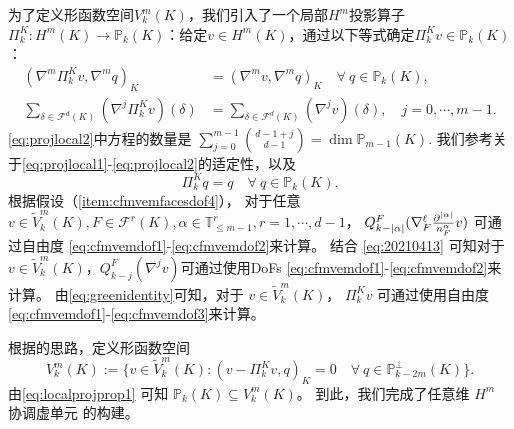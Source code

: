 为了定义形函数空间$V_k^m(K)$，我们引入了一个局部$H^m$投影算子$\Pi_k^K: H^m(K)\to\mathbb P_k(K)$：给定$v\in H^m(K)$，通过以下等式确定$\Pi_k^Kv\in\mathbb P_k(K)$：
\begin{align}
(\nabla^m\Pi_k^Kv, \nabla^mq)_K&=(\nabla^mv, \nabla^mq)_K\quad  \forall~q\in \mathbb P_k(K),\label{eq:projlocal1}\\
\sum_{\delta\in\mathcal F^{d}(K)}(\nabla^{j}\Pi_k^Kv)(\delta)&=\sum_{\delta\in\mathcal F^{d}(K)}(\nabla^{j}v)(\delta), \quad j=0,\cdots, m-1.\label{eq:projlocal2}
\end{align}
\eqref{eq:projlocal2}中方程的数量是
$
\sum\limits_{j=0}^{m-1}{d-1+j\choose d-1}=\dim\mathbb P_{m-1}(K).
$
我们参考\cite[3.3节引理~3.5]{ChenHuang2020}关于\eqref{eq:projlocal1}-\eqref{eq:projlocal2}的适定性，以及
\begin{equation}\label{eq:localprojprop1}
\Pi_k^Kq=q \quad\forall~q\in\mathbb P_k(K).
\end{equation}
根据假设（\ref{item:cfmvemfacesdof4}），
对于任意 $v\in \tilde{V}_{k}^m(K), F\in\mathcal F^r(K), \alpha\in \mathbb{T}^r_{\leq
m-1}, r=1,\cdots,
d-1$，
$Q_{k-|\alpha|}^F(\nabla_F^{\ell}\frac{\partial^{|\alpha|}}{n_F^{\alpha}}v)$
可通过自由度
\eqref{eq:cfmvemdof1}-\eqref{eq:cfmvemdof2}来计算。
结合 \eqref{eq:20210413} 可知对于 $v \in \tilde{V}_k^m(K)$，$Q_{k-j}^F(\nabla^jv)$可通过使用DoFs
\eqref{eq:cfmvemdof1}-\eqref{eq:cfmvemdof2}来计算。
由\eqref{eq:greenidentity}可知，对于 $v\in \tilde{V}_k^m(K)$，
$\Pi_k^Kv$ 可通过使用自由度
\eqref{eq:cfmvemdof1}-\eqref{eq:cfmvemdof3}来计算。

根据\cite{AhmadAlsaediBrezziMariniEtAl2013,ChenHuang2020}的思路，定义形函数空间
$$
V_k^m(K):=\{v\in \widetilde{V}_k^m(K): (v-\Pi_k^Kv, q)_K=0\quad\forall~q\in\mathbb P_{k-2m}^{\perp}(K)\}.
$$
由\eqref{eq:localprojprop1} 可知 $\mathbb P_k(K)\subseteq V_k^m(K)$。
到此，我们完成了任意维 $H^m$ 协调虚单元 %
的构建。

